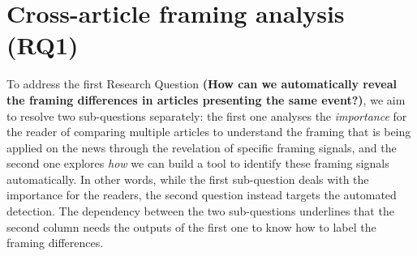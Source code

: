 



\section{Cross-article framing analysis (RQ1)}
\label{sec:prop_rq1}

To address the first Research Question
\textbf{(How can we automatically reveal the framing differences in articles presenting the same event?)}, we aim to resolve two sub-questions separately: the first one analyses the \emph{importance} for the reader of comparing multiple articles to understand the framing that is being applied on the news through the revelation of specific framing signals, and the second one explores \emph{how} we can build a tool to identify these framing signals automatically.
In other words, while the first sub-question deals with the importance for the readers, the second question instead targets the automated detection.
The dependency between the two sub-questions underlines that the second column needs the outputs of the first one to know how to label the framing differences.



